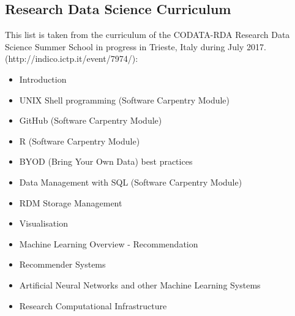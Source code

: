 \documentclass[12pt,a4paper]{article}
\begin{document}
\begin{appendices}
\hypertarget{appendix-b}{%
\section{Research Data Science Curriculum}\label{appendix-b}}

This list is taken from the curriculum of the CODATA-RDA Research Data
Science Summer School in progress in Trieste, Italy during July 2017.
(http://indico.ictp.it/event/7974/):

\begin{itemize}
\item Introduction
\item UNIX Shell programming (Software Carpentry Module)
\item GitHub (Software Carpentry Module)
\item R (Software Carpentry Module)
\item BYOD (Bring Your Own Data) best practices
\item Data Management with SQL  (Software Carpentry Module)
\item RDM Storage Management
\item Visualisation
\item Machine Learning Overview - Recommendation
\item Recommender Systems
\item Artificial Neural Networks and other Machine Learning Systems 
\item Research Computational Infrastructure 
\end{itemize}

\end{appendices}

\sloppy
\raggedright
\clearpage
\printbibliography[title={References},heading=bibintoc]
\end{document}
